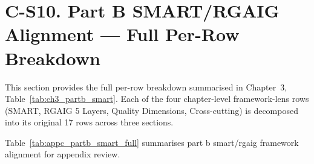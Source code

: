 \section*{C-S10. Part B SMART/RGAIG Alignment --- Full Per-Row Breakdown}
\label{sec:appc_partb_smart_full}

\noindent This section provides the full per-row breakdown summarised in Chapter~3, Table~\ref{tab:ch3_partb_smart}. Each of the four chapter-level framework-lens rows (SMART, RGAIG 5 Layers, Quality Dimensions, Cross-cutting) is decomposed into its original 17 rows across three sections.

\noindent Table~\ref{tab:appc_partb_smart_full} summarises part b smart/rgaig framework alignment for appendix review.


